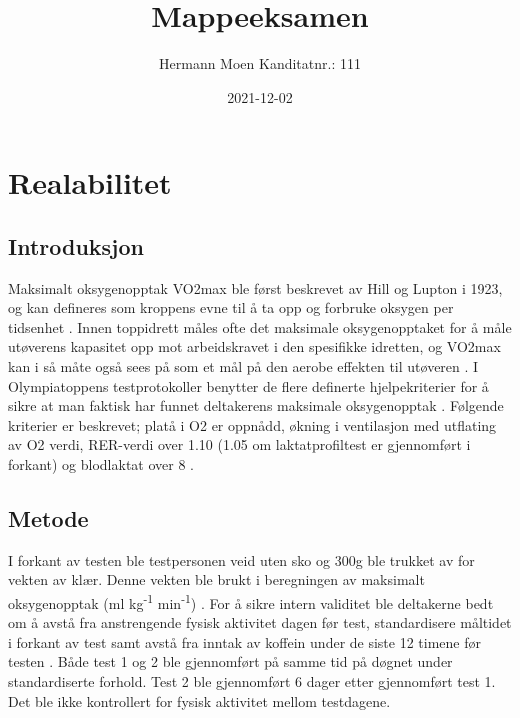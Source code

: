 \documentclass[
]{book}
\title{Mappeeksamen}
\author{Hermann Moen Kanditatnr.: 111}
\date{2021-12-02}
\begin{document}
\maketitle

{
\setcounter{tocdepth}{1}
\tableofcontents
}
\hypertarget{realabilitet}{%
\chapter{Realabilitet}\label{realabilitet}}

\hypertarget{introduksjon}{%
\section{Introduksjon}\label{introduksjon}}

Maksimalt oksygenopptak VO2max ble først beskrevet av Hill og Lupton i 1923, og kan defineres som kroppens evne til å ta opp og forbruke oksygen per tidsenhet \citep{bassett2000, hill1923}. Innen toppidrett måles ofte det maksimale oksygenopptaket for å måle utøverens kapasitet opp mot arbeidskravet i den spesifikke idretten, og VO2max kan i så måte også sees på som et mål på den aerobe effekten til utøveren \citep{bassett2000}. I Olympiatoppens testprotokoller benytter de flere definerte hjelpekriterier for å sikre at man faktisk har funnet deltakerens maksimale oksygenopptak \citep{tønnessen2017}. Følgende kriterier er beskrevet; platå i O2 er oppnådd, økning i ventilasjon med utflating av O2 verdi, RER-verdi over 1.10 (1.05 om laktatprofiltest er gjennomført i forkant) og blodlaktat over 8 \citep{tønnessen2017}.

\hypertarget{metode}{%
\section{Metode}\label{metode}}

I forkant av testen ble testpersonen veid uten sko og 300g ble trukket av for vekten av klær. Denne vekten ble brukt i beregningen av maksimalt oksygenopptak (ml kg\textsuperscript{-1} min\textsuperscript{-1}) . For å sikre intern validitet ble deltakerne bedt om å avstå fra anstrengende fysisk aktivitet dagen før test, standardisere måltidet i forkant av test samt avstå fra inntak av koffein under de siste 12 timene før testen \citep{halperin2015}. Både test 1 og 2 ble gjennomført på samme tid på døgnet under standardiserte forhold. Test 2 ble gjennomført 6 dager etter gjennomført test 1. Det ble ikke kontrollert for fysisk aktivitet mellom testdagene.
\end{document}
